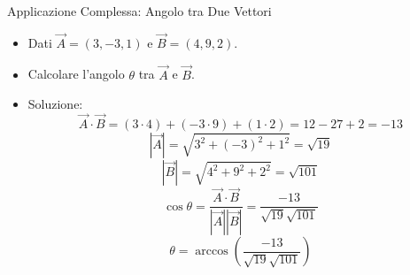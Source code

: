 \documentclass{beamer}
\begin{document}
\begin{frame}{Applicazione Complessa: Angolo tra Due Vettori}
    \begin{itemize}
        \item Dati \( \vec{A} = (3, -3, 1) \) e \( \vec{B} = (4, 9, 2) \).
        \item Calcolare l'angolo \( \theta \) tra \( \vec{A} \) e \( \vec{B} \).
        \item Soluzione:
        \[
        \vec{A} \cdot \vec{B} = (3 \cdot 4) + (-3 \cdot 9) + (1 \cdot 2) = 12 -27 + 2 = -13
        \]
        \[
        |\vec{A}| = \sqrt{3^2 + (-3)^2 + 1^2} = \sqrt{19}
        \]
        \[
        |\vec{B}| = \sqrt{4^2 + 9^2 + 2^2} = \sqrt{101}
        \]
        \[
        \cos\theta = \frac{\vec{A} \cdot \vec{B}}{|\vec{A}||\vec{B}|} = \frac{-13}{\sqrt{19} \sqrt{101}}
        \]
        \[
        \theta = \arccos\left(\frac{-13}{\sqrt{19} \sqrt{101}}\right)
        \]
    \end{itemize}
\end{frame}

\end{document}
